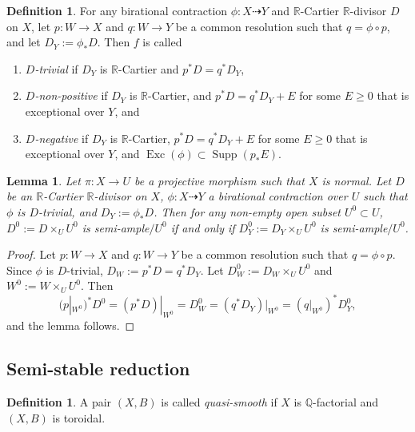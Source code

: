 \documentclass[11pt]{amsart}
\numberwithin{equation}{section}
\newcommand{\Qq}{\mathbb{Q}}
\newcommand{\Rr}{\mathbb{R}}
\newcommand{\Exc}{\operatorname{Exc}}
\newcommand{\Supp}{\operatorname{Supp}}
\newtheorem{lem}[thm]{Lemma}
\theoremstyle{definition}
\newtheorem{defn}[thm]{Definition}
\theoremstyle{definition}
\theoremstyle{definition}
\begin{document}
\begin{defn}
For any birational contraction $\phi: X\dashrightarrow Y$ and $\Rr$-Cartier $\Rr$-divisor $D$ on $X$, let $p: W\rightarrow X$ and $q: W\rightarrow Y$ be a common resolution such that $q=\phi\circ p$, and let $D_Y:=\phi_*D$. Then $f$ is called
\begin{enumerate}
    \item \emph{$D$-trivial} if $D_Y$ is $\Rr$-Cartier and $p^*D=q^*D_Y$,
    \item \emph{$D$-non-positive} if $D_Y$ is $\Rr$-Cartier, and $p^*D=q^*D_Y+E$ for some $E\geq 0$ that is exceptional over $Y$, and
    \item \emph{$D$-negative} if $D_Y$ is $\Rr$-Cartier, $p^*D=q^*D_Y+E$ for some $E\geq 0$ that is exceptional over $Y$, and $\Exc(\phi)\subset\Supp (p_*E)$.
\end{enumerate}
\end{defn}




\begin{lem}\label{lem: trivial map keep property over an open subset}
Let $\pi: X\rightarrow U$ be a projective morphism such that $X$ is normal. Let $D$ be an $\Rr$-Cartier $\Rr$-divisor on $X$, $\phi: X\dashrightarrow Y$ a birational contraction over $U$ such that $\phi$ is $D$-trivial, and $D_Y:=\phi_*D$. Then for any non-empty open subset $U^0\subset U$, $D^0:=D\times_UU^0$ is semi-ample$/U^0$ if and only if $D_Y^0:=D_Y\times_UU^0$ is  semi-ample$/U^0$.
\end{lem}
\begin{proof}
Let $p: W\rightarrow X$ and $q: W\rightarrow Y$ be a common resolution such that $q=\phi\circ p$. Since $\phi$ is $D$-trivial, $D_W:=p^*D=q^*D_Y$. Let $D_W^0:=D_W\times_UU^0$ and $W^0:=W\times_UU^0$. Then
$$(p|_{W^0})^*D^0=(p^*D)|_{W^0}=D_W^0=(q^*D_Y)|_{W^0}=(q|_{W^0})^*D^0_Y,$$
and the lemma follows.
\end{proof}

\subsection{Semi-stable reduction}



\begin{defn}
A pair $(X,B)$ is called \emph{quasi-smooth} if $X$ is $\Qq$-factorial and $(X,B)$ is toroidal.
\end{defn}

\end{document}
